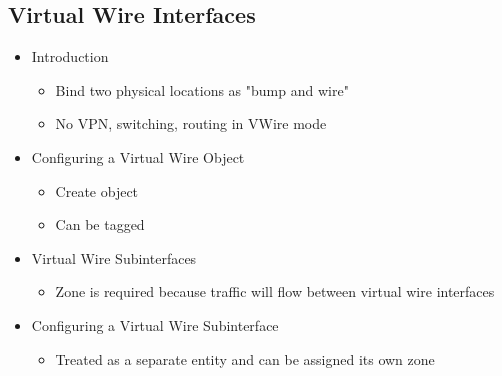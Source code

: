 \subsection{Virtual Wire Interfaces}
    \begin{itemize}
        \item Introduction
            \begin{itemize}
                \item Bind two physical locations as "bump and wire"
                \item No VPN, switching, routing in VWire mode
            \end{itemize}
        \item Configuring a Virtual Wire Object
            \begin{itemize}
                \item Create object
                \item Can be tagged
            \end{itemize}
        \item Virtual Wire Subinterfaces
            \begin{itemize}
                \item Zone is required because traffic will flow between virtual wire interfaces
            \end{itemize}
        \item Configuring a Virtual Wire Subinterface
            \begin{itemize}
                \item Treated as a separate entity and can be assigned its own zone
            \end{itemize}
    \end{itemize}
    
